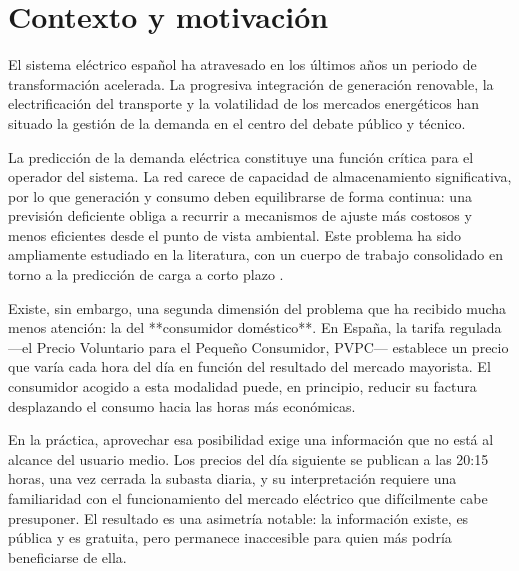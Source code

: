 %



\section{Contexto y motivación}

El sistema eléctrico español ha atravesado en los últimos años un periodo de
transformación acelerada. La progresiva integración de generación renovable, la
electrificación del transporte y la volatilidad de los mercados energéticos han
situado la gestión de la demanda en el centro del debate público y técnico.

La predicción de la demanda eléctrica constituye una función crítica para el
operador del sistema. La red carece de capacidad de almacenamiento significativa,
por lo que generación y consumo deben equilibrarse de forma continua: una
previsión deficiente obliga a recurrir a mecanismos de ajuste más costosos y
menos eficientes desde el punto de vista ambiental. Este problema ha sido
ampliamente estudiado en la literatura, con un cuerpo de trabajo consolidado en
torno a la predicción de carga a corto plazo \parencite{hong2016probabilistic}.

Existe, sin embargo, una segunda dimensión del problema que ha recibido mucha
menos atención: la del **consumidor doméstico**. En España, la tarifa regulada
—el Precio Voluntario para el Pequeño Consumidor, PVPC— establece un precio que
varía cada hora del día en función del resultado del mercado mayorista. El
consumidor acogido a esta modalidad puede, en principio, reducir su factura
desplazando el consumo hacia las horas más económicas.

En la práctica, aprovechar esa posibilidad exige una información que no está al
alcance del usuario medio. Los precios del día siguiente se publican a las 20:15
horas, una vez cerrada la subasta diaria, y su interpretación requiere una
familiaridad con el funcionamiento del mercado eléctrico que difícilmente cabe
presuponer. El resultado es una asimetría notable: la información existe, es
pública y es gratuita, pero permanece inaccesible para quien más podría
beneficiarse de ella.

